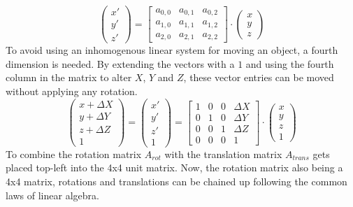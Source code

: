 \begin{equation*}
    \begin{pmatrix}
    x'  \\
    y'  \\
    z' 
    \end{pmatrix} 
    = 
    \begin{bmatrix}
a_{0,0} & a_{0,1} & a_{0,2}  \\
a_{1,0} & a_{1,1} & a_{1,2}  \\
a_{2,0} & a_{2,1} & a_{2,2} 
\end{bmatrix}
\cdot 
\begin{pmatrix}
    x  \\
    y  \\
    z 
    \end{pmatrix}
\end{equation*}
To avoid using an inhomogenous linear system for moving an object, a fourth dimension is needed. By extending the vectors with a $1$ and using the fourth column in the matrix to alter $X$, $Y$ and $Z$, these vector entries can be moved without applying any rotation. 
\begin{equation*}
    \begin{pmatrix}
        x+\Delta X  \\
        y+\Delta Y  \\
        z+\Delta Z  \\
        1
        \end{pmatrix} 
        = 
    \begin{pmatrix}
    x'  \\
    y'  \\
    z'  \\
    1
    \end{pmatrix} 
    = 
    \begin{bmatrix}
1 & 0 & 0 & \Delta X \\
0 & 1 & 0 & \Delta Y  \\
0 & 0 & 1 & \Delta Z  \\
0 & 0 & 0 & 1
\end{bmatrix}
\cdot 
\begin{pmatrix}
    x  \\
    y  \\
    z  \\
    1
    \end{pmatrix}
\end{equation*}
To combine the rotation matrix $A_{rot}$ with the translation matrix $A_{trans}$ gets placed top-left into the 4x4 unit matrix. Now, the rotation matrix also being a 4x4 matrix, rotations and translations can be chained up following the common laws of linear algebra.
